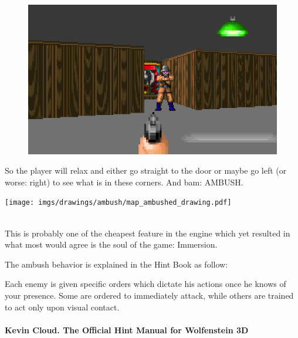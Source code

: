 \par
\begin{figure}[H]
 \centering
 \includegraphics[width=\textwidth]{screenshots/ambush/map_ambushed.png}
\end{figure}
\par
\begin{minipage}{0.6\textwidth}
So the player will relax and either go straight to the door or maybe go left (or worse: right) to see what is in these corners. And bam: AMBUSH.
\end{minipage}
\begin{minipage}{0.4\textwidth}
\begin{flushright}
\texttt{[image: imgs/drawings/ambush/map\_ambushed\_drawing.pdf]}
\end{flushright}
\end{minipage}
\noindent
\\

This is probably one of the cheapest feature in the engine which yet resulted in what most would agree is the soul of the game: Immersion.\\
\par

 The ambush behavior is explained in the Hint Book as follow:\\
\par
\begin{fancyquotes}
Each enemy is given specific orders which dictate his actions once he knows of your presence. Some are ordered to immediately attack, while others are trained to act only upon visual contact.
 \bigskip \\
\bigskip \\
\textbf{Kevin Cloud. The Official Hint Manual for Wolfenstein 3D}
 \end{fancyquotes}


